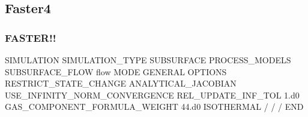 \documentclass{beamer}
\begin{document}
\subsection{Faster4}
\begin{frame}[fragile]\frametitle{FASTER!!}

\begin{semiverbatim}
SIMULATION
  SIMULATION_TYPE SUBSURFACE
  PROCESS_MODELS
    SUBSURFACE_FLOW flow
      MODE GENERAL 
      OPTIONS
        RESTRICT_STATE_CHANGE
        ANALYTICAL_JACOBIAN
        USE_INFINITY_NORM_CONVERGENCE
        REL_UPDATE_INF_TOL 1.d0
        GAS_COMPONENT_FORMULA_WEIGHT 44.d0  
        ISOTHERMAL 
      /
    /
  /
END
\end{semiverbatim}

\end{frame}

\end{document}
